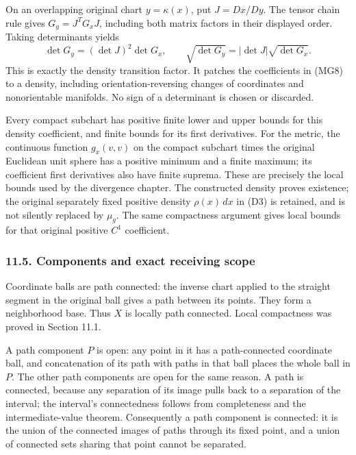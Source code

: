 \documentclass[
  11pt,
]{article}
\begin{document}
On an overlapping original chart \(y=\kappa(x)\), put \(J=Dx/Dy\). The
tensor chain rule gives \(G_y=J^TG_xJ\), including both matrix factors
in their displayed order. Taking determinants yields \[
 \det G_y=(\det J)^2\det G_x,\qquad
 \sqrt{\det G_y}
   =|\det J|\sqrt{\det G_x}.
                                                               \tag{MG9}
\] This is exactly the density transition factor. It patches the
coefficients in (MG8) to a density, including orientation-reversing
changes of coordinates and nonorientable manifolds. No sign of a
determinant is chosen or discarded.

Every compact subchart has positive finite lower and upper bounds for
this density coefficient, and finite bounds for its first derivatives.
For the metric, the continuous function \(g_x(v,v)\) on the compact
subchart times the original Euclidean unit sphere has a positive minimum
and a finite maximum; its coefficient first derivatives also have finite
suprema. These are precisely the local bounds used by the divergence
chapter. The constructed density proves existence; the original
separately fixed positive density \(\rho(x)\,dx\) in (D3) is retained,
and is not silently replaced by \(\mu_g\). The same compactness argument
gives local bounds for that original positive \(C^1\) coefficient.

\subsubsection{11.5. Components and exact receiving
scope}\label{components-and-exact-receiving-scope}

Coordinate balls are path connected: the inverse chart applied to the
straight segment in the original ball gives a path between its points.
They form a neighborhood base. Thus \(X\) is locally path connected.
Local compactness was proved in Section 11.1.

A path component \(P\) is open: any point in it has a path-connected
coordinate ball, and concatenation of its path with paths in that ball
places the whole ball in \(P\). The other path components are open for
the same reason. A path is connected, because any separation of its
image pulls back to a separation of the interval; the interval's
connectedness follows from completeness and the intermediate-value
theorem. Consequently a path component is connected: it is the union of
the connected images of paths through its fixed point, and a union of
connected sets sharing that point cannot be separated.
\end{document}
